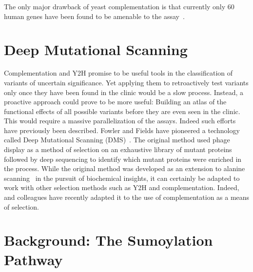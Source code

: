 The only major drawback of yeast complementation is that currently only 60 human genes have been found to be amenable to the assay~\cite{sun_extended_2016}. %


\section{Deep Mutational Scanning}

Complementation and Y2H promise to be useful tools in the classification of variants of uncertain significance. Yet applying them to retroactively test variants only once they have been found in the clinic would be a slow process. Instead, a proactive approach could prove to be more useful: Building an atlas of the functional effects of all possible variants before they are even seen in the clinic. This would require a massive parallelization of the assays. Indeed such efforts have previously been described. Fowler and Fields have pioneered a technology called Deep Mutational Scanning (DMS)~\cite{fowler_high-resolution_2010}. The original method used phage display as a method of selection on an exhaustive library of mutant proteins followed by deep sequencing to identify which mutant proteins were enriched in the process. While the original method was developed as an extension to alanine scanning~\cite{alanineScanning} in the pursuit of biochemical insights, it can certainly be adapted to work with other selection methods such as Y2H and complementation. Indeed,  and colleagues have recently adapted it to the use of complementation as a means of selection.


\section{Background: The Sumoylation Pathway}

